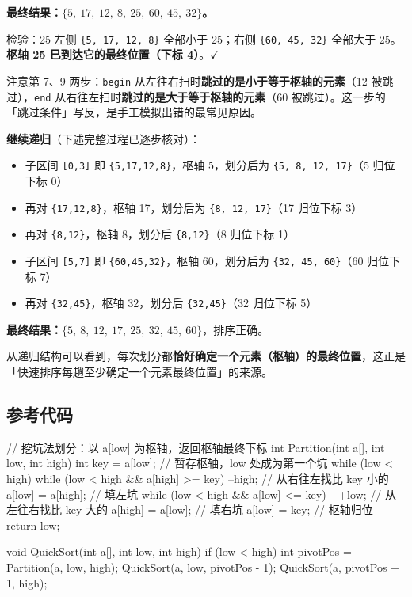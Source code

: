 \documentclass[11pt,openany,UTF8]{ctexbook}
\begin{document}
\textbf{最终结果：$\{5,\ 17,\ 12,\ 8,\ 25,\ 60,\ 45,\ 32\}$。}

检验：25 左侧 \texttt{\{5,\allowbreak{} 17,\allowbreak{} 12,\allowbreak{} 8\}} 全部小于 25；右侧 \texttt{\{60,\allowbreak{} 45,\allowbreak{} 32\}} 全部大于 25。\textbf{枢轴 25 已到达它的最终位置（下标 4）}。$\checkmark$

注意第 7、9 两步：\texttt{begin} 从左往右扫时\textbf{跳过的是小于等于枢轴的元素}（12 被跳过），\texttt{end} 从右往左扫时\textbf{跳过的是大于等于枢轴的元素}（60 被跳过）。这一步的「跳过条件」写反，是手工模拟出错的最常见原因。

\textbf{继续递归}（下述完整过程已逐步核对）：

\begin{itemize}
\item 子区间 \texttt{[0,\allowbreak{}3]\allowbreak{}} 即 \texttt{\{5,\allowbreak{}17,\allowbreak{}12,\allowbreak{}8\}}，枢轴 5，划分后为 \texttt{\{5,\allowbreak{} 8,\allowbreak{} 12,\allowbreak{} 17\}}（5 归位下标 0）
\item 再对 \texttt{\{17,\allowbreak{}12,\allowbreak{}8\}}，枢轴 17，划分后为 \texttt{\{8,\allowbreak{} 12,\allowbreak{} 17\}}（17 归位下标 3）
\item 再对 \texttt{\{8,\allowbreak{}12\}}，枢轴 8，划分后 \texttt{\{8,\allowbreak{}12\}}（8 归位下标 1）
\item 子区间 \texttt{[5,\allowbreak{}7]\allowbreak{}} 即 \texttt{\{60,\allowbreak{}45,\allowbreak{}32\}}，枢轴 60，划分后为 \texttt{\{32,\allowbreak{} 45,\allowbreak{} 60\}}（60 归位下标 7）
\item 再对 \texttt{\{32,\allowbreak{}45\}}，枢轴 32，划分后 \texttt{\{32,\allowbreak{}45\}}（32 归位下标 5）
\end{itemize}
\textbf{最终结果：$\{5,\ 8,\ 12,\ 17,\ 25,\ 32,\ 45,\ 60\}$}，排序正确。

从递归结构可以看到，每次划分都\textbf{恰好确定一个元素（枢轴）的最终位置}，这正是「快速排序每趟至少确定一个元素最终位置」的来源。

\subsection{参考代码}

\begin{codebox}
// 挖坑法划分：以 a[low] 为枢轴，返回枢轴最终下标
int Partition(int a[], int low, int high) {
    int key = a[low];                 // 暂存枢轴，low 处成为第一个坑
    while (low < high) {
        while (low < high && a[high] >= key) --high;  // 从右往左找比 key 小的
        a[low] = a[high];                             // 填左坑
        while (low < high && a[low] <= key) ++low;    // 从左往右找比 key 大的
        a[high] = a[low];                             // 填右坑
    }
    a[low] = key;                     // 枢轴归位
    return low;
}

void QuickSort(int a[], int low, int high) {
    if (low < high) {
        int pivotPos = Partition(a, low, high);
        QuickSort(a, low, pivotPos - 1);
        QuickSort(a, pivotPos + 1, high);
    }
}
\end{codebox}
\end{document}
